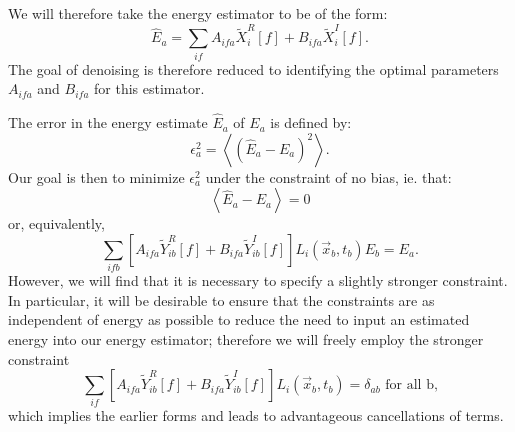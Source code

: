 We will therefore take the energy estimator to be of the form:
\begin{equation}
\widehat{E}_a = \sum_{if} A_{ifa} \widetilde{X}_i^R[f] + B_{ifa} \widetilde{X}_i^I[f].
\end{equation}
The goal of denoising is therefore reduced to identifying the optimal parameters $A_{ifa}$ and $B_{ifa}$ for this estimator.

The error in the energy estimate $\widehat{E}_a$ of $E_a$ is defined by:
\begin{equation}
\epsilon^2_a = \left< \left(\widehat{E}_a - E_a\right)^2\right>.
\end{equation}
Our goal is then to minimize $\epsilon^2_a$ under the constraint of no bias, ie. that:
\begin{equation}\label{eqn:ConstraintForm1}
\left<\widehat{E}_a - E_a\right> = 0
\end{equation}
or, equivalently,
\[\sum_{ifb}\left[A_{ifa} \widetilde{Y}_{ib}^R[f] + B_{ifa} \widetilde{Y}_{ib}^I[f]\right] L_i(\vec{x}_b,t_b) E_b = E_a.\]
However, we will find that it is necessary to specify a slightly stronger constraint.  In particular, it will be desirable to ensure that the constraints are as independent of energy as possible to reduce the need to input an estimated energy into our energy estimator; therefore we will freely employ the stronger constraint
\begin{equation}
\sum_{if}\left[A_{ifa} \widetilde{Y}_{ib}^R[f] + B_{ifa} \widetilde{Y}_{ib}^I[f]\right] L_i(\vec{x}_b,t_b) = \delta_{ab} \text{~for all b,} \label{eqn:ConstraintForm3}
\end{equation}
which implies the earlier forms and leads to advantageous cancellations of terms.

